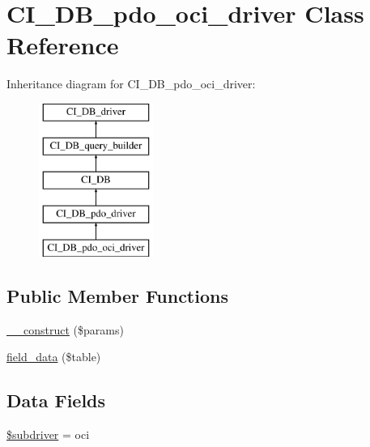 \hypertarget{class_c_i___d_b__pdo__oci__driver}{}\section{C\+I\+\_\+\+D\+B\+\_\+pdo\+\_\+oci\+\_\+driver Class Reference}
\label{class_c_i___d_b__pdo__oci__driver}
Inheritance diagram for C\+I\+\_\+\+D\+B\+\_\+pdo\+\_\+oci\+\_\+driver\+:\begin{figure}[H]
\begin{center}
\leavevmode
\includegraphics[height=5.000000cm]{class_c_i___d_b__pdo__oci__driver}
\end{center}
\end{figure}
\subsection*{Public Member Functions}
\begin{DoxyCompactItemize}
\item 
\hyperlink{class_c_i___d_b__pdo__oci__driver_a9162320adff1a1a4afd7f2372f753a3e}{\+\_\+\+\_\+construct} (\$params)
\item 
\hyperlink{class_c_i___d_b__pdo__oci__driver_a90355121e1ed009e0efdbd544ab56efa}{field\+\_\+data} (\$table)
\end{DoxyCompactItemize}
\subsection*{Data Fields}
\begin{DoxyCompactItemize}
\item 
\hyperlink{class_c_i___d_b__pdo__oci__driver_a1322ca756348b11d080cb7a4f590de15}{\$subdriver} = \textquotesingle{}oci\textquotesingle{}
\end{DoxyCompactItemize}
